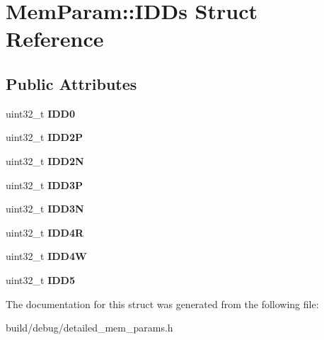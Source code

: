 \hypertarget{structMemParam_1_1IDDs}{\section{Mem\-Param\-:\-:I\-D\-Ds Struct Reference}
\label{structMemParam_1_1IDDs}
}
\subsection*{Public Attributes}
\begin{DoxyCompactItemize}
\item 
\hypertarget{structMemParam_1_1IDDs_a8fcfe9e934164ff83e346230f169dabf}{uint32\-\_\-t {\bfseries I\-D\-D0}}\label{structMemParam_1_1IDDs_a8fcfe9e934164ff83e346230f169dabf}

\item 
\hypertarget{structMemParam_1_1IDDs_a4b7c8f54fa62e4aff3e19b75bf6de6c4}{uint32\-\_\-t {\bfseries I\-D\-D2\-P}}\label{structMemParam_1_1IDDs_a4b7c8f54fa62e4aff3e19b75bf6de6c4}

\item 
\hypertarget{structMemParam_1_1IDDs_ac9edff647fcc8a29e5dff344f666f882}{uint32\-\_\-t {\bfseries I\-D\-D2\-N}}\label{structMemParam_1_1IDDs_ac9edff647fcc8a29e5dff344f666f882}

\item 
\hypertarget{structMemParam_1_1IDDs_a82d176b52f517b4454717022f2eb90cf}{uint32\-\_\-t {\bfseries I\-D\-D3\-P}}\label{structMemParam_1_1IDDs_a82d176b52f517b4454717022f2eb90cf}

\item 
\hypertarget{structMemParam_1_1IDDs_aa3070fa8a506b2c430330c7cc64d86ae}{uint32\-\_\-t {\bfseries I\-D\-D3\-N}}\label{structMemParam_1_1IDDs_aa3070fa8a506b2c430330c7cc64d86ae}

\item 
\hypertarget{structMemParam_1_1IDDs_a3f407bf4130cb9cd19debd2c211c6c2c}{uint32\-\_\-t {\bfseries I\-D\-D4\-R}}\label{structMemParam_1_1IDDs_a3f407bf4130cb9cd19debd2c211c6c2c}

\item 
\hypertarget{structMemParam_1_1IDDs_af5352db154c1e132d9f2f9d9f667d2a6}{uint32\-\_\-t {\bfseries I\-D\-D4\-W}}\label{structMemParam_1_1IDDs_af5352db154c1e132d9f2f9d9f667d2a6}

\item 
\hypertarget{structMemParam_1_1IDDs_afcbefd971416f3bf373fe52f392f8eee}{uint32\-\_\-t {\bfseries I\-D\-D5}}\label{structMemParam_1_1IDDs_afcbefd971416f3bf373fe52f392f8eee}

\end{DoxyCompactItemize}


The documentation for this struct was generated from the following file\-:\begin{DoxyCompactItemize}
\item 
build/debug/detailed\-\_\-mem\-\_\-params.\-h\end{DoxyCompactItemize}
